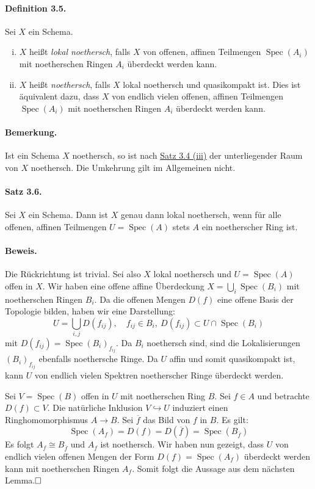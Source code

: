 \documentclass[11pt,b5paper,openany]{memoir}
\def \qed {$\hfill\square$}
\begin{document}
\paragraph{Definition 3.5.}\label{3.5} Sei $X$ ein Schema.
\begin{enumerate}[(i)]
\item $X$ heißt \textit{lokal noethersch}, falls $X$ von offenen, affinen Teilmengen $\operatorname{Spec}(A_i)$ mit noetherschen Ringen $A_i$ überdeckt werden kann.
\item $X$ heißt \textit{noethersch}, falls $X$ lokal noethersch und quasikompakt ist. Dies ist äquivalent dazu, dass $X$ von endlich vielen offenen, affinen Teilmengen $\operatorname{Spec}(A_i)$ mit noetherschen Ringen $A_i$ überdeckt werden kann.
\end{enumerate}

\paragraph{Bemerkung.} Ist ein Schema $X$ noethersch, so ist nach \hyperref[3.4]{Satz 3.4 (iii)} der unterliegender Raum von $X$ noethersch. Die Umkehrung gilt im Allgemeinen nicht.

\paragraph{Satz 3.6.}\label{3.6} Sei $X$ ein Schema. Dann ist $X$ genau dann lokal noethersch, wenn für alle offenen, affinen Teilmengen $U=\operatorname{Spec}(A)$ stets $A$ ein noetherscher Ring ist.

\paragraph{Beweis.} Die Rückrichtung ist trivial. Sei also $X$ lokal noethersch und $U=\operatorname{Spec}(A)$ offen in $X$. Wir haben eine offene affine Überdeckung $X=\bigcup_i\operatorname{Spec}(B_i)$ mit noetherschen Ringen $B_i$. Da die offenen Mengen $D(f)$ eine offene Basis der Topologie bilden, haben wir eine Darstellung:
\[U=\bigcup_{i,j} D(f_{ij}),\quad f_{ij}\in B_i,\ D(f_{ij})\subset U\cap \operatorname{Spec}(B_i) \]
mit $D(f_{ij})=\operatorname{Spec}(B_i)_{f_{ij}}$. Da $B_i$ noethersch sind, sind die Lokalisierungen $(B_i)_{f_{ij}}$ ebenfalls noethersche Ringe. Da $U$ affin und somit quasikompakt ist, kann $U$ von endlich vielen Spektren noetherscher Ringe überdeckt werden.

Sei $V=\operatorname{Spec}(B)$ offen in $U$ mit noetherschen Ring $B$. Sei $f\in A$ und betrachte $D(f)\subset V$. Die natürliche Inklusion $V\hookrightarrow U$ induziert einen Ringhomomorphismus $A\to B$. Sei $\overline{f}$ das Bild von $f$ in $B$. Es gilt:
\[\operatorname{Spec}(A_f)=D(f)=D(\overline{f})=\operatorname{Spec}(B_{\overline{f}})\]
Es folgt $A_f\cong B_{\overline{f}}$ und $A_f$ ist noethersch. Wir haben nun gezeigt, dass $U$ von endlich vielen offenen Mengen der Form $D(f)=\operatorname{Spec}(A_f)$ überdeckt werden kann mit noetherschen Ringen $A_f$. Somit folgt die Aussage aus dem nächsten Lemma.\qed
\end{document}

